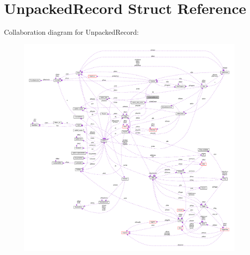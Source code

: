 \hypertarget{struct_unpacked_record}{\section{Unpacked\-Record Struct Reference}
\label{struct_unpacked_record}
}


Collaboration diagram for Unpacked\-Record\-:\nopagebreak
\begin{figure}[H]
\begin{center}
\leavevmode
\includegraphics[width=350pt]{struct_unpacked_record__coll__graph}
\end{center}
\end{figure}
